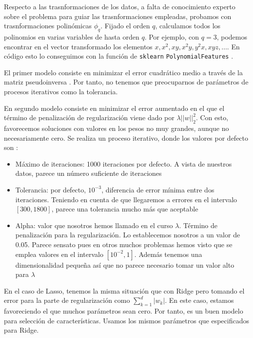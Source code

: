 \documentclass[11pt]{article}
\begin{document}
Respecto a las trasnformaciones de los datos, a falta de conocimiento experto sobre el problema para guiar las trasnformaciones empleadas, probamos con trasnformaciones polinómicas $\phi_q$. Fijado el orden $q$, calculamos todos los polinomios en varias variables de hasta orden $q$. Por ejemplo, con $q=3$, podemos encontrar en el vector transformado los elementos $x, x^2, xy, x^2y, y^2x, xyz, \ldots$. En código esto lo conseguimos con la función de \lstinline{sklearn} \lstinline{PolynomialFeatures} \cite{sklearn_polynomial:online}.

El primer modelo consiste en minimizar el error cuadrático medio a través de la matriz pseudoinversa \cite{sklearn_linear_reg:online}. Por tanto, no tenemos que preocuparnos de parámetros de procesos iterativos como la tolerancia.

En segundo modelo consiste en minimizar el error aumentado en el que el término de penalización de regularización viene dado por $\lambda ||w||^2_2$. Con esto, favorecemos soluciones con valores en los pesos no muy grandes, aunque no necesariamente cero. Se realiza un proceso iterativo, donde los valores por defecto son \cite{sklearn_ridge:online}:

\begin{itemize}
    \item Máximo de iteraciones: 1000 iteraciones por defecto. A vista de nuestros datos, parece un número suficiente de iteraciones
    \item Tolerancia: por defecto, $10^{-3}$, diferencia de error mínima entre dos iteraciones. Teniendo en cuenta de que llegaremos a errores en el intervalo $[300, 1800]$, parece una tolerancia mucho más que aceptable
    \item Alpha: valor que nosotros hemos llamado en el curso $\lambda$. Término de penalización para la regularización. Lo establecemos nosotros a un valor de 0.05. Parece sensato pues en otros muchos problemas hemos visto que se emplea valores en el intervalo $[10^{-2}, 1]$. Además tenemos una dimensionalidad pequeña así que no parece necesario tomar un valor alto para $\lambda$
\end{itemize}

En el caso de Lasso, tenemos la misma situación que con Ridge pero tomando el error para la parte de regularización como $\sum_{k = 1}^{d} |w_k|$. En este caso, estamos favoreciendo el que muchos parámetros sean cero. Por tanto, es un buen modelo para selección de características. Usamos los mismos parámetros que especificados para Ridge.
\end{document}
